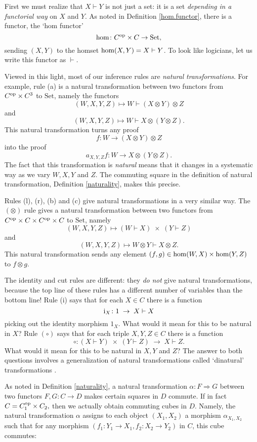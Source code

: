 \documentclass[12pt]{article}
\newcommand{\Set}{\mathrm{Set}}
\newcommand{\maps}{\colon}
\newcommand{\lHom}{\vdash}
\renewcommand{\hom}{{\rm hom}}
\newcommand{\tensor}{\otimes}
\newcommand{\id}{{\rm i}}
\newcommand{\op}{{\rm op}}
\begin{document}
First we must realize that $X \lHom Y$ is not just a set: it is a set 
{\em depending in a functorial way} on $X$ and $Y$.   As noted in
Definition \ref{hom.functor}, there is a functor, the `hom functor'
$$    \hom \maps C^\op \times C \to \Set, $$ 
sending $(X,Y)$ to the homset $\hom(X,Y) = X \lHom Y$.  To look like
logicians, let us write this functor as $\lHom$.

Viewed in this light, most of our inference rules are {\it natural 
transformations}.  For example, rule (a) is a natural transformation 
between two functors from $C^\op \times C^3$ to $\Set$, namely
the functors 
\[        (W,X,Y,Z) \mapsto W \lHom (X \tensor Y) \tensor Z \]
and 
\[        (W,X,Y,Z) \mapsto W \lHom X \tensor (Y \tensor Z) .\]
This natural transformation turns any proof
\[        f \maps W \to (X \tensor Y) \tensor Z \]
into the proof
\[  a_{X,Y,Z} f \maps W \to X \tensor (Y \tensor Z)  .\]
The fact that this transformation is {\it natural} means that it
changes in a systematic way as we vary $W,X,Y$ and $Z$.  The
commuting square in the definition of natural transformation,
Definition \ref{naturality}, makes this precise.

Rules (l), (r), (b) and (c) give natural transformations in a 
very similar way.   The $(\tensor)$ rule gives a natural transformation 
between two functors from $C^\op \times C \times C^\op \times C$ 
to $\Set$, namely
\[       (W,X,Y,Z) \mapsto (W \lHom X) \; \times \; (Y \lHom Z) \]
and 
\[       (W,X,Y,Z) \mapsto W \tensor Y \lHom X \tensor Z .\]
This natural transformation sends any element $(f,g) \in 
\hom(W,X) \times \hom(Y,Z)$ to $f \tensor g$. 

The identity and cut rules are different: they {\it do not} give 
natural transformations, because the top line of these rules has a 
different number of variables than the bottom line!
Rule (i) says that for each $X \in C$ there is a function 
\[ \id_X \maps 1 \; \to \; X \lHom X \] 
picking out the identity morphism $1_X.$  
What would it mean for this to be natural in $X$?
Rule $(\circ)$ says that for each triple $X,Y,Z \in C$ there is
a function
\[     \circ \maps (X \lHom Y) \; \times \; (Y \lHom Z) \; \to \; X \lHom Z .\] 
What would it mean for this to be natural in $X,Y$ and $Z$? 
The answer to both questions involves a generalization of natural
transformations called `dinatural' transformations \cite{MacLane}.

As noted in Definition \ref{naturality},
a natural transformation $\alpha \maps F\Rightarrow G$ between two functors 
$F, G \maps C \to D$ makes certain squares in $D$ commute.  
If in fact $C=C_1^{\op} \times C_2,$ then we actually obtain commuting 
cubes in $D.$  Namely, the natural transformation $\alpha$ assigns to each 
object $(X_1, X_2)$ a morphism $\alpha_{X_1,X_2}$ such that for any 
morphism $(f_1 \maps Y_1\to X_1, f_2 \maps X_2\to Y_2)$ in $C$, 
this cube commutes:
\end{document}
